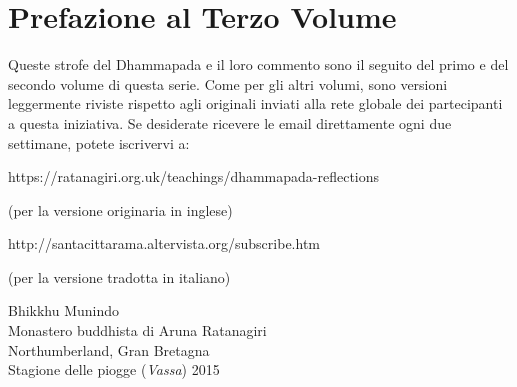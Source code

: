 \chapter{Prefazione al Terzo Volume}

Queste strofe del Dhammapada e il loro commento sono il seguito del
primo e del secondo volume di questa serie. Come per gli altri volumi,
sono versioni leggermente riviste rispetto agli originali inviati alla
rete globale dei partecipanti a questa iniziativa. Se desiderate
ricevere le email direttamente ogni due settimane, potete iscrivervi a:

\bigskip

\noindent
https://ratanagiri.org.uk/teachings/dhammapada-reflections

\smallskip

\noindent
(per la versione originaria in inglese)

\bigskip

\noindent
http://santacittarama.altervista.org/subscribe.htm

\smallskip

\noindent
(per la versione tradotta in italiano)

\bigskip

{\par\raggedleft
Bhikkhu Munindo\\
Monastero buddhista di Aruna Ratanagiri\\
Northumberland, Gran Bretagna\\
Stagione delle piogge (\emph{Vassa}) 2015
\par}
